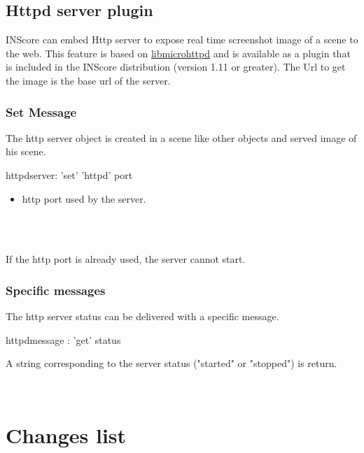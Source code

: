 \documentclass[a4paper,twoside]{report}
\newcommand{\toplevel}[1]	{\chapter{#1}}
\newcommand{\sublevel}[1]	{\section{#1}}
\newcommand{\subsublevel}[1]	{\subsection{#1}}
\begin{document}
\sublevel{Httpd server plugin}
\label{Httpd}

INScore can embed Http server to expose real time screenshot image of a scene to the web. This feature is based on \href{http://www.gnu.org/software/libmicrohttpd/}{libmicrohttpd} and is available as a plugin that is included in the INScore distribution (version 1.11 or greater). The Url to get the image is the base url of the server.

\subsublevel{Set Message}
\label{httpdsetmsg}

The http server object is created in a scene like other objects and served image of his scene.


\begin{rail}
httpdserver: 'set' 'httpd' port
\end{rail}

\begin{itemize}
\item {} http port used by the server.
\end{itemize}

\example \\

\note{} \\
If the http port is already used, the server cannot start.

\subsublevel{Specific messages}
\label{httpdmsg}
The http server status can be delivered with a specific message.


\begin{rail}
httpdmessage : 'get' status
\end{rail}

A string corresponding to the server status ("started" or "stopped") is return.

\example \\


\toplevel{ Changes list}
\label{changes}



\printindex
\end{document}
